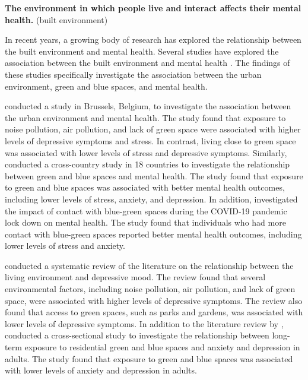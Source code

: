 \documentclass[
  letterpaper,
  authoryear]{elsarticle}
\begin{document}
\textbf{The environment in which people live and interact affects their
mental health.} (built environment)

In recent years, a growing body of research has explored the
relationship between the built environment and mental health. Several
studies have explored the association between the built environment and
mental health
\citep{pelgrimsAssociationUrbanEnvironment2021, whiteAssociationsGreenBlue2021, rautioLivingEnvironmentIts2018, pousoContactBluegreenSpaces2021, gasconLongtermExposureResidential2018, engemann2019, hoisingtonTenQuestionsConcerning2019}.
The findings of these studies specifically investigate the association
between the urban environment, green and blue spaces, and mental health.

\citet{pelgrimsAssociationUrbanEnvironment2021} conducted a study in
Brussels, Belgium, to investigate the association between the urban
environment and mental health. The study found that exposure to noise
pollution, air pollution, and lack of green space were associated with
higher levels of depressive symptoms and stress. In contrast, living
close to green space was associated with lower levels of stress and
depressive symptoms. Similarly, \citet{whiteAssociationsGreenBlue2021}
conducted a cross-country study in 18 countries to investigate the
relationship between green and blue spaces and mental health. The study
found that exposure to green and blue spaces was associated with better
mental health outcomes, including lower levels of stress, anxiety, and
depression. In addition, \citet{pousoContactBluegreenSpaces2021}
investigated the impact of contact with blue-green spaces during the
COVID-19 pandemic lock down on mental health. The study found that
individuals who had more contact with blue-green spaces reported better
mental health outcomes, including lower levels of stress and anxiety.

\citet{rautioLivingEnvironmentIts2018} conducted a systematic review of
the literature on the relationship between the living environment and
depressive mood. The review found that several environmental factors,
including noise pollution, air pollution, and lack of green space, were
associated with higher levels of depressive symptoms. The review also
found that access to green spaces, such as parks and gardens, was
associated with lower levels of depressive symptoms. In addition to the
literature review by \citet{rautioLivingEnvironmentIts2018},
\citet{gasconLongtermExposureResidential2018} conducted a
cross-sectional study to investigate the relationship between long-term
exposure to residential green and blue spaces and anxiety and depression
in adults. The study found that exposure to green and blue spaces was
associated with lower levels of anxiety and depression in adults.
\end{document}
